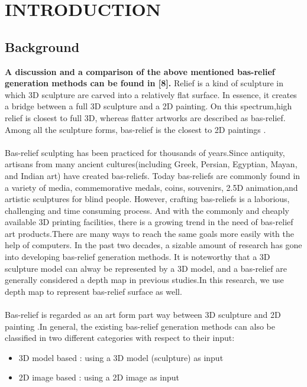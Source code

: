 \chapter{INTRODUCTION}

\section{Background}
\textbf{ A discussion
	and a comparison of the above mentioned bas-relief
	generation methods can be found in [8]. }
Relief is a kind of sculpture in which 3D sculpture are carved into a relatively flat surface. In essence, it creates a bridge between a full 3D sculpture and a 2D painting. On this spectrum,high relief is closest to full 3D, whereas flatter artworks are described as bas-relief. Among all the sculpture forms, bas-relief is the closest to 2D paintings\cite{kerber2009feature} \cite{barron2012color}.\\ \\
Bas-relief sculpting has been practiced for thousands of years.Since antiquity, artisans from many ancient cultures(including Greek, Persian, Egyptian, Mayan, and Indian art) have created bas-reliefs.
Today bas-reliefs are commonly found in a variety of media, commemorative medals, coins, souvenirs, 2.5D animation,and artistic sculptures for blind people. However, crafting bas-reliefs is a laborious, challenging and time consuming process. And with the commonly and cheaply available 3D printing facilities, there is a growing trend in the need of bas-relief art products.There are many ways to reach the same goals more easily with the help of computers. In the past two decades, a sizable amount of research has gone into developing bas-relief generation methods\cite{benzaid2017analysis}. It is noteworthy that a 3D sculpture model can alway be represented by a 3D model, and a bas-relief are generally considered a depth map in previous studies.In this research, we use depth map to represent bas-relief surface as well.\\ \\ 
Bas-relief is regarded as an art form part way between 3D sculpture and 2D painting \cite{benzaid2017analysis}\cite{barron2012color}\cite{weyrich2007digital}\cite{kerber2009feature}\cite{kerber2012computer}.In general, the existing bas-relief generation methods can also be classified in two different categories with respect to their input\cite{benzaid2017analysis}:
\begin{itemize}
 \item 3D model based : using a 3D model (sculpture) as input 
 \item 2D image based : using a 2D image as input 
\end{itemize} 
